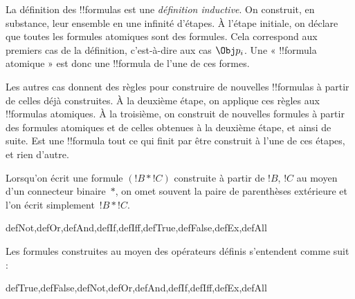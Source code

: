 \documentclass[../../../include/open-logic-section]{subfiles}
\begin{document}
\begin{explain}
La définition des !!{formula}s est une \emph{définition inductive}.
On construit, en substance, leur ensemble en une infinité d'étapes.
À l'étape initiale, on déclare que toutes les formules atomiques sont
des formules. Cela correspond aux premiers cas de la définition,
c'est-à-dire aux cas
%
%
$\Obj p_i$. Une « !!{formula} atomique » est donc une !!{formula}
de l'une de ces formes.

Les autres cas donnent des règles pour construire de nouvelles
!!{formula}s à partir de celles déjà construites. À la deuxième étape,
on applique ces règles aux !!{formula}s atomiques. À la troisième,
on construit de nouvelles formules à partir des formules atomiques
et de celles obtenues à la deuxième étape, et ainsi de suite.
Est une !!{formula} tout ce qui finit par être construit à l'une
de ces étapes, et rien d'autre.
\end{explain}

Lorsqu'on écrit une formule $(!B \ast !C)$ construite à partir de
$!B$, $!C$ au moyen d'un connecteur binaire~$\ast$, on omet souvent
la paire de parenthèses extérieure et l'on écrit simplement~$!B \ast !C$.

\begin{tagblock}{defNot,defOr,defAnd,defIf,defIff,defTrue,defFalse,defEx,defAll}
\begin{defn}
Les formules construites au moyen des opérateurs définis s'entendent
comme suit :

\begin{tagenumerate}{defTrue,defFalse,defNot,defOr,defAnd,defIf,defIff,defEx,defAll}







\end{tagenumerate}
\end{defn}
%
%
%
%
\end{tagblock}
\end{document}

